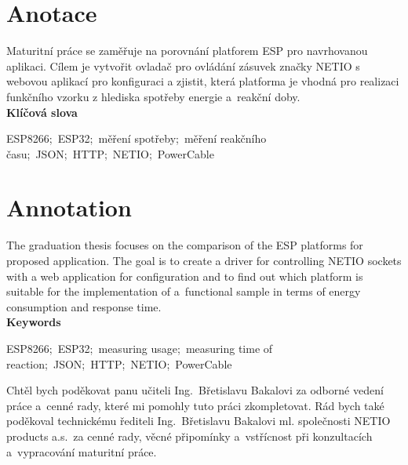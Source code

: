 \documentclass[a4paper, 12pt]{report}
\begin{document}
    \nocite{*}
    \renewcommand{\listingscaption}{Úryvek kódu}


    \titulniStrana
    \section*{Anotace}
    Maturitní práce se zaměřuje na porovnání platforem ESP pro navrhovanou aplikaci.
    Cílem je vytvořit ovladač pro ovládání zásuvek značky NETIO s webovou aplikací pro konfiguraci a zjistit, která platforma je vhodná pro realizaci funkčního vzorku z hlediska spotřeby energie a~reakční doby.\\
    \textbf{Klíčová slova}\par
    ESP8266;\ ESP32;\ měření spotřeby;\ měření reakčního času;\ JSON;\ HTTP;\ NETIO;\ PowerCable

    \section*{Annotation}
    The graduation thesis focuses on the comparison of the ESP platforms for proposed application.
    The goal is to create a driver for controlling NETIO sockets with a web application for configuration and to find out which platform is suitable for the implementation of a~functional sample in terms of energy consumption and response time.\\
    \textbf{Keywords}\par
    ESP8266;\ ESP32;\ measuring usage;\ measuring time of reaction;\ JSON;\ HTTP;\ NETIO;\ PowerCable

    \podekovani
    Chtěl bych poděkovat panu učiteli Ing.~Břetislavu Bakalovi za odborné vedení práce a~cenné rady, které mi pomohly tuto práci zkompletovat.
    Rád bych také poděkoval technickému řediteli Ing.~Břetislavu Bakalovi ml.
    společnosti NETIO products a.s.\ za cenné rady, věcné připomínky a~vstřícnost při konzultacích a~vypracování maturitní práce. \par
    \tableofcontents
\end{document}
